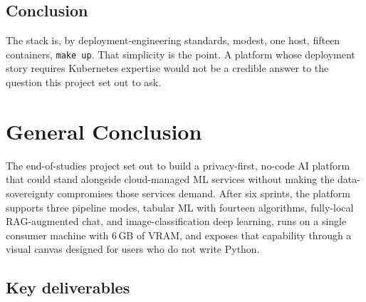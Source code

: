 \documentclass[12pt, a4paper, oneside]{report}
\begin{document}
\section*{Conclusion}

The stack is, by deployment-engineering standards, modest, one
host, fifteen containers, \texttt{make up}. That simplicity is the
point. A platform whose deployment story requires Kubernetes
expertise would not be a credible answer to the question this
project set out to ask.

\chapter*{General Conclusion}

The end-of-studies project set out to build a privacy-first, no-code
AI platform that could stand alongside cloud-managed ML services
without making the data-sovereignty compromises those services
demand. After six sprints, the platform supports three pipeline
modes, tabular ML with fourteen algorithms, fully-local
RAG-augmented chat, and image-classification deep learning, runs
on a single consumer machine with $6$\,GB of VRAM, and exposes that
capability through a visual canvas designed for users who do not
write Python.

\section*{Key deliverables}
\end{document}

